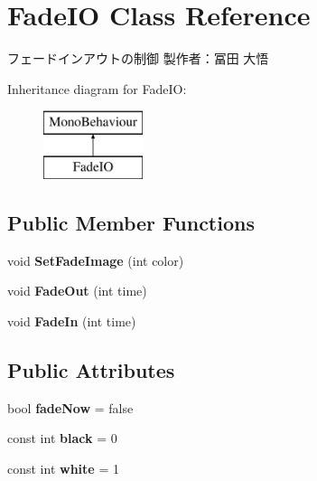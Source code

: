 \hypertarget{class_fade_i_o}{}\section{Fade\+IO Class Reference}
\label{class_fade_i_o}


フェードインアウトの制御 製作者：冨田 大悟  


Inheritance diagram for Fade\+IO\+:\begin{figure}[H]
\begin{center}
\leavevmode
\includegraphics[height=2.000000cm]{class_fade_i_o}
\end{center}
\end{figure}
\subsection*{Public Member Functions}
\begin{DoxyCompactItemize}
\item 
\mbox{\label{class_fade_i_o_a408f9b407c1f78bac133a97a0b6c3a93}} 
void {\bfseries Set\+Fade\+Image} (int color)
\item 
\mbox{\label{class_fade_i_o_a907e8983525536c3ea7942d3b452b03c}} 
void {\bfseries Fade\+Out} (int time)
\item 
\mbox{\label{class_fade_i_o_ad2bf293738160f9e676e23ed9cb78fff}} 
void {\bfseries Fade\+In} (int time)
\end{DoxyCompactItemize}
\subsection*{Public Attributes}
\begin{DoxyCompactItemize}
\item 
\mbox{\label{class_fade_i_o_ad8b04a7d48847e9824d2864f983dab05}} 
bool {\bfseries fade\+Now} = false
\item 
\mbox{\label{class_fade_i_o_a7ba938d694db1953fca54f73b2a604de}} 
const int {\bfseries black} = 0
\item 
\mbox{\label{class_fade_i_o_a4a24dc57dbc952df12a7ee82f833c209}} 
const int {\bfseries white} = 1
\end{DoxyCompactItemize}
